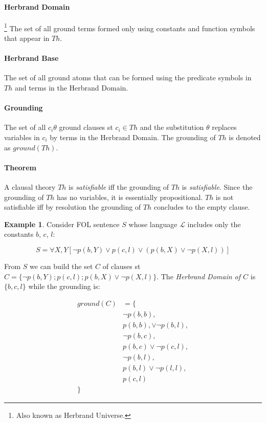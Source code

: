 \documentclass{article}
\theoremstyle{plain}
\theoremstyle{definition}
\newtheorem{exmp}[thm]{Example} %
\begin{document}
\begin{multicols}{2}
\paragraph{Herbrand Domain}\footnote{Also known as Herbrand Universe.} The set of all ground terms formed only using constants and function symbols that appear in $Th$.

\paragraph{Herbrand Base} The set of all ground atoms that can be formed using the predicate symbols in $Th$ and terms in the Herbrand Domain.

\paragraph{Grounding} The set of all $c_i\theta$ ground clauses st $c_i \in Th$ and the substitution $\theta$ replaces variables in $c_i$ by terms in the Herbrand Domain. The grounding of $Th$ is denoted as $ground(Th)$.

\paragraph{Theorem} A clausal theory $Th$ is \textit{satisfiable} iff the grounding of $Th$ is \textit{satisfiable}. Since the grounding of $Th$ has no variables, it is essentially propositional. $Th$ is not satisfiable iff by resolution the grounding of $Th$ concludes to the empty clause.

\begin{exmp}\label{exmp:HerbrandTheorem} Consider FOL sentence $S$ whose language $\mathcal{L}$ includes only the constants $b$, $c$, $l$:\end{exmp}

$$S = \forall X, Y [\lnot p(b, Y) \lor p(c, l) \lor (p(b, X)\lor \lnot p(X, l))]$$

\noindent From $S$ we can build the set $C$ of clauses st $C = \{\lnot p(b, Y); p(c,l); p(b, X) \lor \lnot p(X, l)\}$. The \textit{Herbrand Domain of $C$} is $\{b, c, l\}$ while the grounding is:

\begin{align*}
ground(C) &= \{\\
	&\lnot p(b, b),\\
	&p(b, b), \lor \lnot p(b, l),\\
	&\lnot p(b, c),\\
	&p(b, c) \lor \lnot p(c, l),\\
	&\lnot p(b, l),\\
	&p(b, l) \lor \lnot p(l, l),\\
	&p(c, l)\\
	\}&
\end{align*}


\end{multicols}
\end{document}
